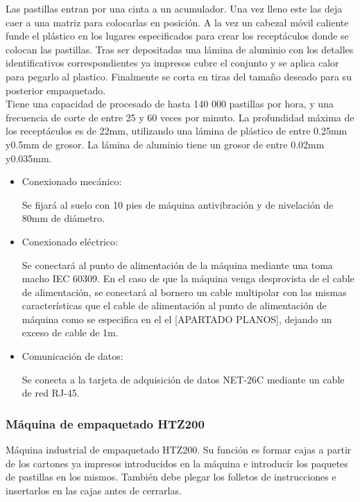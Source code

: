	

	Las pastillas entran por una cinta a un acumulador. Una vez lleno este las deja caer a una matriz para colocarlas en posición. A la vez un cabezal móvil caliente funde el plástico en los lugares especificados para crear los receptáculos donde se colocan las pastillas. Tras ser depositadas una lámina de aluminio con los detalles identificativos correspondientes ya impresos cubre el conjunto y se aplica calor para pegarlo al plastico. Finalmente se corta en tiras del tamaño deseado para su posterior empaquetado.\\

	Tiene una capacidad de procesado de hasta 140 000 pastillas por hora, y una frecuencia de corte de entre 25 y 60 veces por minuto. La profundidad máxima de los receptáculos es de 22mm, utilizando una lámina de plástico de entre 0.25mm y0.5mm de grosor. La lámina de aluminio tiene un grosor de entre 0.02mm y0.035mm.


		\begin{itemize}
				\item{Conexionado mecánico:}
				
				Se fijará al suelo con 10 pies de máquina antivibración y de nivelación de 80mm de diámetro.

				\item{Conexionado eléctrico:}

				Se conectará al punto de alimentación de la máquina mediante una  toma macho IEC 60309. En el caso de que la máquina venga desprovista de el cable de alimentación, se conectará al bornero un cable multipolar con las mismas características que el cable de alimentación al punto de alimentación de máquina como se especifica en el el [APARTADO PLANOS], dejando un exceso de cable de 1m. \
				
				\item{Comunicación de datos:}

				Se conecta a la tarjeta de adquisición de datos NET-26C mediante un cable de red RJ-45.
		\end{itemize}
	
	\newpage

	\subsubsection{Máquina de empaquetado HTZ200}

	

	Máquina industrial de empaquetado HTZ200. Su función es formar cajas a partir de los cartones ya impresos introducidos en la máquina e introducir los paquetes de pastillas en los mismos. También debe plegar los folletos de instrucciones e insertarlos en las cajas antes de cerrarlas. \\

